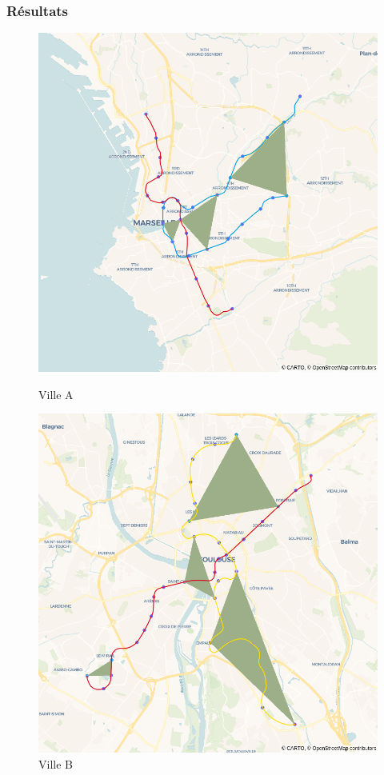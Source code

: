 \documentclass{beamer}
\begin{document}
\begin{frame}
    \frametitle{Résultats}
    \begin{figure}[h]
        \centering
        \begin{minipage}[c]{.42\linewidth}
            \centering
            \includegraphics[width=1.1\textwidth]{../../Code/images/marseille.png}
            \caption{Ville A}
        \end{minipage}
        \hfill
        \begin{minipage}[c]{.42\linewidth}
            \centering
            \includegraphics[width=1.1\textwidth]{../../Code/images/toulouse.png}
            \caption{Ville B}
        \end{minipage}
    \end{figure}
\end{frame}
\end{document}

